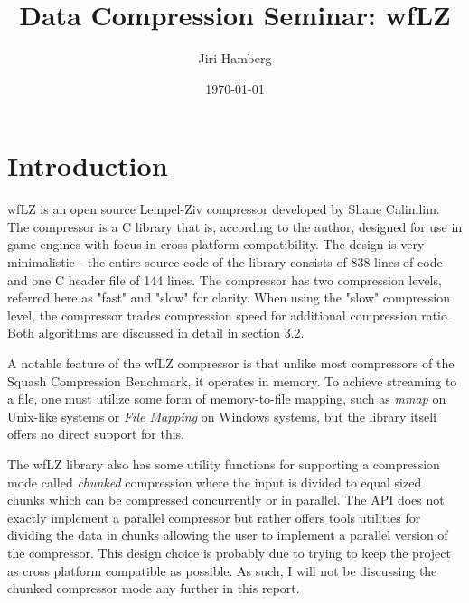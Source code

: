 \documentclass[english]{tktltiki2}
\title{Data Compression Seminar: wfLZ}
\author{Jiri Hamberg}
\date{\today}
\theoremstyle{definition}
\theoremstyle{remark}
\begin{document}

\frontmatter      %

\maketitle        %

\tableofcontents  %


\mainmatter       %

\section{Introduction}

wfLZ is an open source Lempel-Ziv compressor developed by Shane Calimlim. The compressor is a C library that is, according to the author, designed for use in game engines with focus in cross platform compatibility. The design is very minimalistic - the entire source code of the library consists of 838 lines of code and one C header file of 144 lines. The compressor has two compression levels, referred here as "fast" and "slow" for clarity. When using the "slow" compression level, the compressor trades compression speed for additional compression ratio. Both algorithms are discussed in detail in section 3.2.  

A notable feature of the wfLZ compressor is that unlike most compressors of the Squash Compression Benchmark, it operates in memory. To achieve streaming to a file, one must utilize some form of memory-to-file mapping, such as \textit{mmap} on Unix-like systems or \textit{File Mapping} on Windows systems, but the library itself offers no direct support for this.

The wfLZ library also has some utility functions for supporting a compression mode called \textit{chunked} compression where the input is divided to equal sized chunks which can be compressed concurrently or in parallel. The API does not exactly implement a parallel compressor but rather offers tools utilities for dividing the data in chunks allowing the user to implement a parallel version of the compressor. This design choice is probably due to trying to keep the project as cross platform compatible as possible. As such, I will not be discussing the chunked compressor mode any further in this report. 
\end{document}
